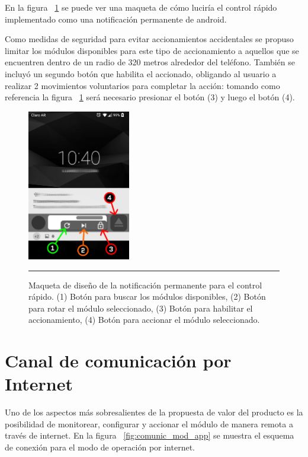 En la figura ~\ref{fig:notif_design} se puede ver una maqueta de cómo luciría el control rápido implementado como una notificación permanente de android.

Como medidas de seguridad para evitar accionamientos accidentales se propuso limitar los módulos
disponibles para este tipo de accionamiento a aquellos que se encuentren dentro de un radio de 320 metros alrededor del teléfono. También se incluyó un segundo botón que habilita el accionado, obligando al usuario a realizar 2 movimientos voluntarios para completar la acción: tomando como referencia la figura ~\ref{fig:notif_design} será necesario presionar el botón (3) y luego el botón (4).


\begin{figure}[htbp]
	\centering
	\includegraphics[width=0.4\textwidth]{Figures/iter3/module_notif.png}
	\rule{35em}{1pt}
	\caption[Wireframe]{Maqueta de diseño de la notificación permanente para el control rápido. (1) Botón para buscar los módulos disponibles, (2) Botón para rotar el módulo seleccionado, (3) Botón para habilitar el accionamiento, (4) Botón para accionar el módulo seleccionado.}
	\label{fig:notif_design}
\end{figure}

\section{Canal de comunicación por Internet}
Uno de los aspectos más sobresalientes de la propuesta de valor del producto es la posibilidad
de monitorear, configurar y accionar el módulo de manera remota a través de internet.
En la figura ~\ref{fig:comunic_mod_app} se muestra el esquema de conexión para el modo de operación por internet.
